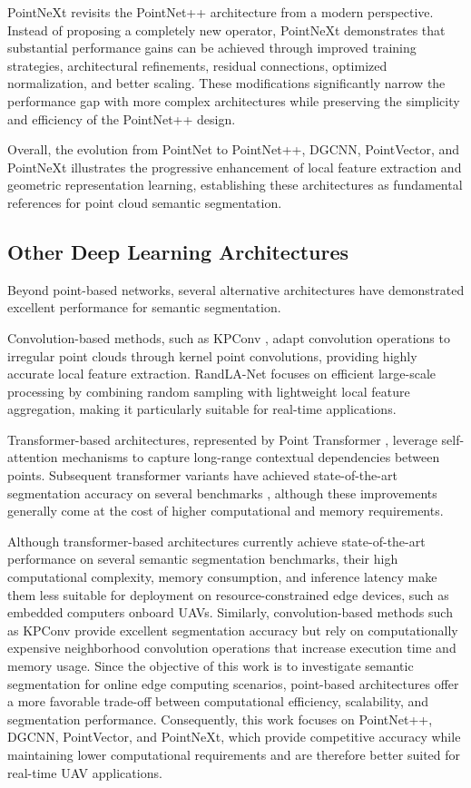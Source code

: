 PointNeXt \cite{PointNeXt} revisits the PointNet++ architecture from a modern perspective. Instead of proposing a completely new operator, PointNeXt demonstrates that substantial performance gains can be achieved through improved training strategies, architectural refinements, residual connections, optimized normalization, and better scaling. These modifications significantly narrow the performance gap with more complex architectures while preserving the simplicity and efficiency of the PointNet++ design.

Overall, the evolution from PointNet to PointNet++, DGCNN, PointVector, and PointNeXt illustrates the progressive enhancement of local feature extraction and geometric representation learning, establishing these architectures as fundamental references for point cloud semantic segmentation.

\subsection{Other Deep Learning Architectures}

Beyond point-based networks, several alternative architectures have demonstrated excellent performance for semantic segmentation.

Convolution-based methods, such as KPConv \cite{Thomas2019KPConv}, adapt convolution operations to irregular point clouds through kernel point convolutions, providing highly accurate local feature extraction. RandLA-Net \cite{Hu2020RandLANet} focuses on efficient large-scale processing by combining random sampling with lightweight local feature aggregation, making it particularly suitable for real-time applications.

Transformer-based architectures, represented by Point Transformer \cite{Zhao2021PointTransformer}, leverage self-attention mechanisms to capture long-range contextual dependencies between points. Subsequent transformer variants have achieved state-of-the-art segmentation accuracy on several benchmarks \cite{PTMF2025,Robert20233DLST}, although these improvements generally come at the cost of higher computational and memory requirements.

Although transformer-based architectures currently achieve state-of-the-art performance on several semantic segmentation benchmarks, their high computational complexity, memory consumption, and inference latency make them less suitable for deployment on resource-constrained edge devices, such as embedded computers onboard UAVs. Similarly, convolution-based methods such as KPConv provide excellent segmentation accuracy but rely on computationally expensive neighborhood convolution operations that increase execution time and memory usage. Since the objective of this work is to investigate semantic segmentation for online edge computing scenarios, point-based architectures offer a more favorable trade-off between computational efficiency, scalability, and segmentation performance. Consequently, this work focuses on PointNet++, DGCNN, PointVector, and PointNeXt, which provide competitive accuracy while maintaining lower computational requirements and are therefore better suited for real-time UAV applications.

